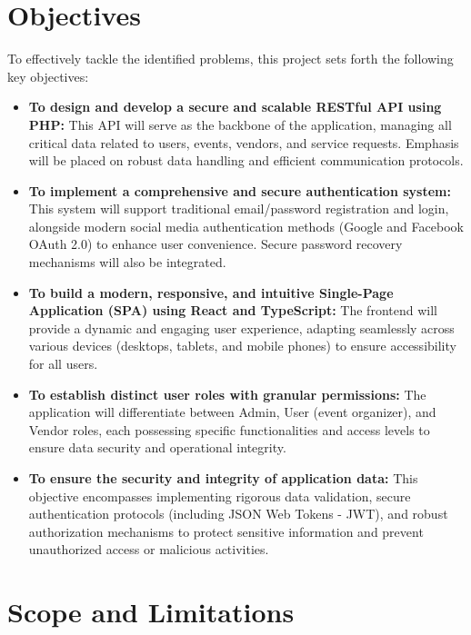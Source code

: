 \documentclass{report}
\begin{document}
\section{Objectives}
\label{sec:objectives}
To effectively tackle the identified problems, this project sets forth the following key objectives:
\begin{itemize}
    \item \textbf{To design and develop a secure and scalable RESTful API using PHP:} This API will serve as the backbone of the application, managing all critical data related to users, events, vendors, and service requests. Emphasis will be placed on robust data handling and efficient communication protocols.
    \item \textbf{To implement a comprehensive and secure authentication system:} This system will support traditional email/password registration and login, alongside modern social media authentication methods (Google and Facebook OAuth 2.0) to enhance user convenience. Secure password recovery mechanisms will also be integrated.
    \item \textbf{To build a modern, responsive, and intuitive Single-Page Application (SPA) using React and TypeScript:} The frontend will provide a dynamic and engaging user experience, adapting seamlessly across various devices (desktops, tablets, and mobile phones) to ensure accessibility for all users.
    \item \textbf{To establish distinct user roles with granular permissions:} The application will differentiate between Admin, User (event organizer), and Vendor roles, each possessing specific functionalities and access levels to ensure data security and operational integrity.
    \item \textbf{To ensure the security and integrity of application data:} This objective encompasses implementing rigorous data validation, secure authentication protocols (including JSON Web Tokens - JWT), and robust authorization mechanisms to protect sensitive information and prevent unauthorized access or malicious activities.
\end{itemize}

\section{Scope and Limitations}
\label{sec:scope_limitations}
\end{document}
